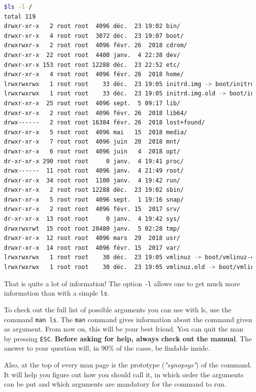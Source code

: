 \documentclass[12pt]{article}
\begin{document}
\begin{lstlisting}[language=bash]
$ls -l /
total 119
drwxr-xr-x   2 root root  4096 déc.  23 19:02 bin/
drwxr-xr-x   4 root root  3072 déc.  23 19:07 boot/
drwxrwxr-x   2 root root  4096 févr. 26  2018 cdrom/
drwxr-xr-x  22 root root  4400 janv.  4 22:38 dev/
drwxr-xr-x 153 root root 12288 déc.  23 22:52 etc/
drwxr-xr-x   4 root root  4096 févr. 26  2018 home/
lrwxrwxrwx   1 root root    33 déc.  23 19:05 initrd.img -> boot/initrd.img-4.15.0-43-generic
lrwxrwxrwx   1 root root    33 déc.  23 19:05 initrd.img.old -> boot/initrd.img-4.15.0-33-generic
drwxr-xr-x  25 root root  4096 sept.  5 09:17 lib/
drwxr-xr-x   2 root root  4096 févr. 26  2018 lib64/
drwx------   2 root root 16384 févr. 26  2018 lost+found/
drwxr-xr-x   5 root root  4096 mai   15  2018 media/
drwxr-xr-x   7 root root  4096 juin  20  2018 mnt/
drwxr-xr-x   6 root root  4096 juin   4  2018 opt/
dr-xr-xr-x 290 root root     0 janv.  4 19:41 proc/
drwx------  11 root root  4096 janv.  4 21:49 root/
drwxr-xr-x  34 root root  1100 janv.  4 19:42 run/
drwxr-xr-x   2 root root 12288 déc.  23 19:02 sbin/
drwxr-xr-x   5 root root  4096 sept.  1 19:16 snap/
drwxr-xr-x   2 root root  4096 févr. 15  2017 srv/
dr-xr-xr-x  13 root root     0 janv.  4 19:42 sys/
drwxrwxrwt  15 root root 20480 janv.  5 02:28 tmp/
drwxr-xr-x  12 root root  4096 mars  29  2018 usr/
drwxr-xr-x  14 root root  4096 févr. 15  2017 var/
lrwxrwxrwx   1 root root    30 déc.  23 19:05 vmlinuz -> boot/vmlinuz-4.15.0-43-generic
lrwxrwxrwx   1 root root    30 déc.  23 19:05 vmlinuz.old -> boot/vmlinuz-4.15.0-33-generic
\end{lstlisting}

That is quite a lot of information! The option \texttt{-l} allows one to get much more information than with a simple \texttt{ls}.

To check out the full list of possible arguments you can use with ls, use the command \texttt{man ls}.
The \texttt{man} command gives information about the command given as argument. From now on, this will be your best friend. You can quit the man by pressing \texttt{ESC}. \textbf{Before asking for help, always check out the manual}. The answer to your question will, in 90\% of the cases, be findable inside.

Also, at the top of every man page is the prototype (\textit{"synopsys"}) of the command. It will help you figure out how you should call it, in which order the arguments can be put and which arguments are mandatory for the command to run.
\end{document}
